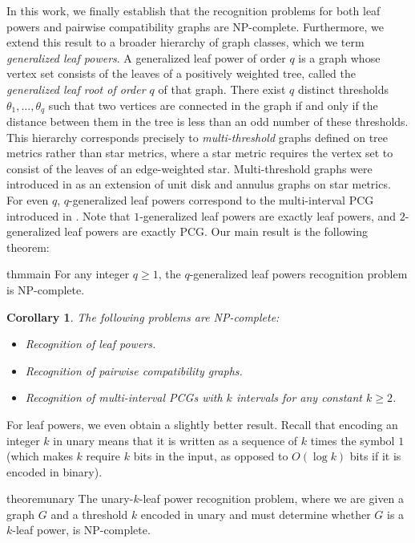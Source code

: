 \documentclass[11pt, letter]{article}
\newtheorem{cor}[theorem]{Corollary}
\theoremstyle{remark}
\begin{document}
 
In this work, we finally establish that the recognition problems for both leaf powers and pairwise compatibility graphs are NP-complete. Furthermore, we extend this result to a broader hierarchy of graph classes, which we term \emph{generalized leaf powers}. A generalized leaf power of order $ q $ is a graph whose vertex set consists of the leaves of a positively weighted tree, called the \emph{generalized leaf root of order $q$} of that graph. There exist $ q $ distinct thresholds $ \theta_1, \dots, \theta_q $ such that two vertices are connected in the graph if and only if the distance between them in the tree is less than an odd number of these thresholds. This hierarchy corresponds precisely to \emph{multi-threshold} graphs defined on tree metrics rather than star metrics, where a star metric requires the vertex set to consist of the leaves of an edge-weighted star. Multi-threshold graphs were introduced in \cite{JamisonSpragueMultiT} as an extension of unit disk and annulus graphs on star metrics. For even $q$, $q$-generalized leaf powers correspond to the multi-interval PCG introduced in \cite{MultiPCG}. Note that $1$-generalized leaf powers are exactly leaf powers, and $2$-generalized leaf powers are exactly PCG. Our main result is the following theorem:

\begin{restatable}{thm}{main}\label{thm:main}
    For any integer $q\geq 1$, the $q$-generalized leaf powers recognition problem is NP-complete.
\end{restatable}

\begin{cor}
    The following problems are NP-complete:
    \begin{itemize}
        \item Recognition of leaf powers.
        \item Recognition of pairwise compatibility graphs.
        \item Recognition of multi-interval PCGs with $k$ intervals for any constant $k \geq 2$.
    \end{itemize}
\end{cor}

For leaf powers, we even obtain a slightly better result.  Recall that encoding an integer $k$ in unary means that it is written as a sequence of $k$ times the symbol $1$ (which makes $k$ require $k$ bits in the input, as opposed to $O(\log k)$ bits if it is encoded in binary).

\begin{restatable}{theorem}{unary}
The unary-$ k $-leaf power recognition problem, where we are given a graph $ G $ and a threshold $ k $ encoded in unary and must determine whether $ G $ is a $ k $-leaf power, is NP-complete.
\end{restatable}
 
\end{document}
